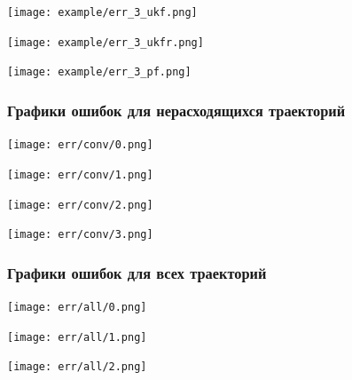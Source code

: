 \documentclass[12pt]{article}
\begin{document}
\begin{landscape}
	\texttt{[image: example/err\_3\_ukf.png]}\newpage
\end{landscape}

\begin{landscape}
	\texttt{[image: example/err\_3\_ukfr.png]}\newpage
\end{landscape}

\begin{landscape}
	\texttt{[image: example/err\_3\_pf.png]}\newpage
\end{landscape}

\begin{landscape}
	\subsubsection{Графики ошибок для нерасходящихся траекторий}
	\texttt{[image: err/conv/0.png]}\newpage
\end{landscape}

\begin{landscape}
	\texttt{[image: err/conv/1.png]}\newpage
\end{landscape}

\begin{landscape}
	\texttt{[image: err/conv/2.png]}\newpage
\end{landscape}

\begin{landscape}
	\texttt{[image: err/conv/3.png]}\newpage
\end{landscape}

\begin{landscape}
	\subsubsection{Графики ошибок для всех траекторий}
	\texttt{[image: err/all/0.png]}\newpage
\end{landscape}

\begin{landscape}
	\texttt{[image: err/all/1.png]}\newpage
\end{landscape}

\begin{landscape}
	\texttt{[image: err/all/2.png]}\newpage
\end{landscape}
\end{document}
